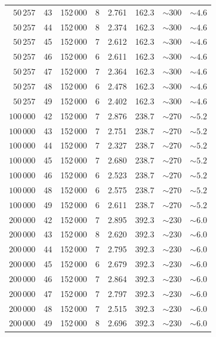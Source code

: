 \documentclass[11pt,a4paper]{article}
\begin{document}
\begin{table}[h]
\begin{tabular}{rrrrrrrr}
$50\,257$   & 43 & 152\,000 & 8 & 2.761 & 162.3 & $\sim\!300$ & $\sim\!4.6$ \\
$50\,257$   & 44 & 152\,000 & 8 & 2.374 & 162.3 & $\sim\!300$ & $\sim\!4.6$ \\
$50\,257$   & 45 & 152\,000 & 7 & 2.612 & 162.3 & $\sim\!300$ & $\sim\!4.6$ \\
$50\,257$   & 46 & 152\,000 & 6 & 2.611 & 162.3 & $\sim\!300$ & $\sim\!4.6$ \\
$50\,257$   & 47 & 152\,000 & 7 & 2.364 & 162.3 & $\sim\!300$ & $\sim\!4.6$ \\
$50\,257$   & 48 & 152\,000 & 6 & 2.478 & 162.3 & $\sim\!300$ & $\sim\!4.6$ \\
$50\,257$   & 49 & 152\,000 & 6 & 2.402 & 162.3 & $\sim\!300$ & $\sim\!4.6$ \\
\midrule
$100\,000$  & 42 & 152\,000 & 7 & 2.876 & 238.7 & $\sim\!270$ & $\sim\!5.2$ \\
$100\,000$  & 43 & 152\,000 & 7 & 2.751 & 238.7 & $\sim\!270$ & $\sim\!5.2$ \\
$100\,000$  & 44 & 152\,000 & 7 & 2.327 & 238.7 & $\sim\!270$ & $\sim\!5.2$ \\
$100\,000$  & 45 & 152\,000 & 7 & 2.680 & 238.7 & $\sim\!270$ & $\sim\!5.2$ \\
$100\,000$  & 46 & 152\,000 & 6 & 2.523 & 238.7 & $\sim\!270$ & $\sim\!5.2$ \\
$100\,000$  & 48 & 152\,000 & 6 & 2.575 & 238.7 & $\sim\!270$ & $\sim\!5.2$ \\
$100\,000$  & 49 & 152\,000 & 6 & 2.611 & 238.7 & $\sim\!270$ & $\sim\!5.2$ \\
\midrule
$200\,000$  & 42 & 152\,000 & 7 & 2.895 & 392.3 & $\sim\!230$ & $\sim\!6.0$ \\
$200\,000$  & 43 & 152\,000 & 8 & 2.620 & 392.3 & $\sim\!230$ & $\sim\!6.0$ \\
$200\,000$  & 44 & 152\,000 & 7 & 2.795 & 392.3 & $\sim\!230$ & $\sim\!6.0$ \\
$200\,000$  & 45 & 152\,000 & 6 & 2.679 & 392.3 & $\sim\!230$ & $\sim\!6.0$ \\
$200\,000$  & 46 & 152\,000 & 7 & 2.864 & 392.3 & $\sim\!230$ & $\sim\!6.0$ \\
$200\,000$  & 47 & 152\,000 & 7 & 2.797 & 392.3 & $\sim\!230$ & $\sim\!6.0$ \\
$200\,000$  & 48 & 152\,000 & 7 & 2.515 & 392.3 & $\sim\!230$ & $\sim\!6.0$ \\
$200\,000$  & 49 & 152\,000 & 8 & 2.696 & 392.3 & $\sim\!230$ & $\sim\!6.0$ \\
\bottomrule
\end{tabular}
\end{table}
\end{document}
